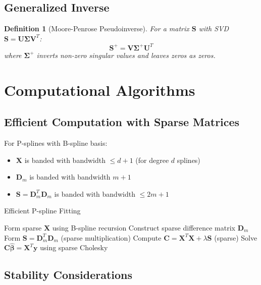 \documentclass[11pt, a4paper]{article}
\newtheorem{definition}{Definition}
\begin{document}
\subsection{Generalized Inverse}
\begin{definition}[Moore-Penrose Pseudoinverse]
For a matrix $\mathbf{S}$ with SVD $\mathbf{S} = \mathbf{U}\bm{\Sigma}\mathbf{V}^T$:
\begin{equation}
\mathbf{S}^+ = \mathbf{V}\bm{\Sigma}^+\mathbf{U}^T
\end{equation}
where $\bm{\Sigma}^+$ inverts non-zero singular values and leaves zeros as zeros.
\end{definition}

\section{Computational Algorithms}

\subsection{Efficient Computation with Sparse Matrices}

For P-splines with B-spline basis:
\begin{itemize}
    \item $\mathbf{X}$ is banded with bandwidth $\leq d+1$ (for degree $d$ splines)
    \item $\mathbf{D}_m$ is banded with bandwidth $m+1$
    \item $\mathbf{S} = \mathbf{D}_m^T\mathbf{D}_m$ is banded with bandwidth $\leq 2m+1$
\end{itemize}

\begin{algorithm}
\caption{Efficient P-spline Fitting}
\begin{algorithmic}[1]
\State Form sparse $\mathbf{X}$ using B-spline recursion
\State Construct sparse difference matrix $\mathbf{D}_m$
\State Form $\mathbf{S} = \mathbf{D}_m^T\mathbf{D}_m$ (sparse multiplication)
\State Compute $\mathbf{C} = \mathbf{X}^T\mathbf{X} + \lambda\mathbf{S}$ (sparse)
\State Solve $\mathbf{C}\hat{\bm{\beta}} = \mathbf{X}^T\mathbf{y}$ using sparse Cholesky
\end{algorithmic}
\end{algorithm}

\subsection{Stability Considerations}
\end{document}
